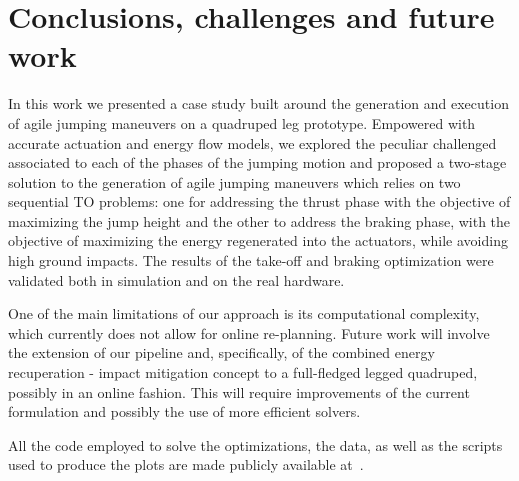 \section{Conclusions, challenges and future work}\label{sec:conclusions}
In this work we presented a case study built around the generation and execution of agile jumping maneuvers on a quadruped leg prototype.  
Empowered with accurate actuation and energy flow models, we explored the peculiar challenged associated to each of the phases of the jumping motion and proposed a two-stage solution to the generation of agile jumping maneuvers which relies on two sequential TO problems: one for addressing the thrust phase with the objective of maximizing the jump height and the other to address the braking phase, with the objective of maximizing the energy regenerated into the actuators, while avoiding high ground impacts. The results of the take-off and braking optimization were validated both in simulation and on the real hardware. 

One of the main limitations of our approach is its computational complexity, which currently does not allow for online re-planning. Future work will involve the extension of our pipeline and, specifically, of the combined energy recuperation - impact mitigation concept to a full-fledged legged quadruped, possibly in an online fashion. This will require improvements of the current formulation and possibly the use of more efficient solvers.  

All the code employed to solve the optimizations, the  data, as well as the scripts used to produce the plots are made publicly available at~\cite{url::awesome_leg_repo}.